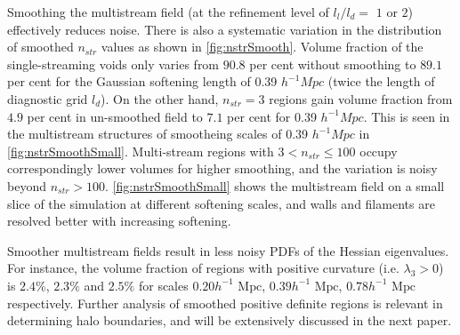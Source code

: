 Smoothing the multistream field (at the refinement level of $l_l/l_d=$ $1$ or $2$) effectively reduces noise. There is also a systematic variation in the distribution of smoothed $n_{str}$ values as shown in \autoref{fig:nstrSmooth}. Volume fraction of the single-streaming voids only varies from $90.8$ per cent without smoothing to $89.1$ per cent for the Gaussian softening length of 0.39 $h^{-1} Mpc$ (twice the length of diagnostic grid $l_d$). On the other hand, $n_{str} = 3$ regions gain volume fraction from $4.9$ per cent in un-smoothed field to $7.1$ per cent for 0.39 $h^{-1} Mpc$. This is seen in the multistream structures of smootheing scales of 0.39 $h^{-1} Mpc$ in \autoref{fig:nstrSmoothSmall}. Multi-stream regions with $ 3 < n_{str} \leq 100 $ occupy correspondingly lower volumes for higher smoothing, and the variation is noisy beyond $n_{str} > 100$. \autoref{fig:nstrSmoothSmall} shows the multistream field on a small slice of the simulation at different softening scales, and walls and filaments are resolved better with increasing softening.                                                                

Smoother multistream fields result in less noisy PDFs of the Hessian eigenvalues. For instance, the volume fraction of regions with positive curvature (i.e. $\lambda_3 > 0$) is $2.4\%$, $2.3\%$ and $2.5\%$ for scales $0.20 h^{-1} \text{ Mpc}$, $0.39 h^{-1} \text{ Mpc}$, $0.78 h^{-1} \text{ Mpc}$ respectively. Further analysis of smoothed positive definite regions is relevant in determining halo boundaries, and will be extensively discussed in the next paper. 

